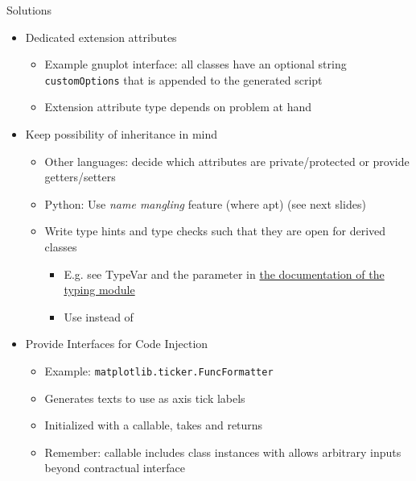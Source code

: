 \begin{frame}{Solutions}
%
\begin{itemize}
\item Dedicated extension attributes
	\begin{itemize}
	\item Example gnuplot interface: all classes have an optional string \texttt{customOptions} that is appended to the generated script
	\item Extension attribute type depends on problem at hand
	\end{itemize}
	\pause
\item Keep possibility of inheritance in mind
	\begin{itemize}
	\item Other languages: decide which attributes are private/protected or provide getters/setters
	\item Python: Use \emph{name mangling} feature (where apt) (see next slides)
	\item Write type hints and type checks such that they are open for derived classes
		\begin{itemize}
		\item E.\;g. see TypeVar and the parameter in \href{https://docs.python.org/3/library/typing.html}{\thus the documentation of the typing module}
		\item Use  instead of  
		\end{itemize}
	\end{itemize}
	\pause
\item Provide Interfaces for Code Injection
	\begin{itemize}
	\item Example: \texttt{matplotlib.ticker.FuncFormatter}
	\item Generates texts to use as axis tick labels
	\item Initialized with a callable, takes  and returns 
	\item Remember: callable includes class instances with  \Thus allows arbitrary inputs beyond contractual interface
	\end{itemize}
\end{itemize}
%
\end{frame}


